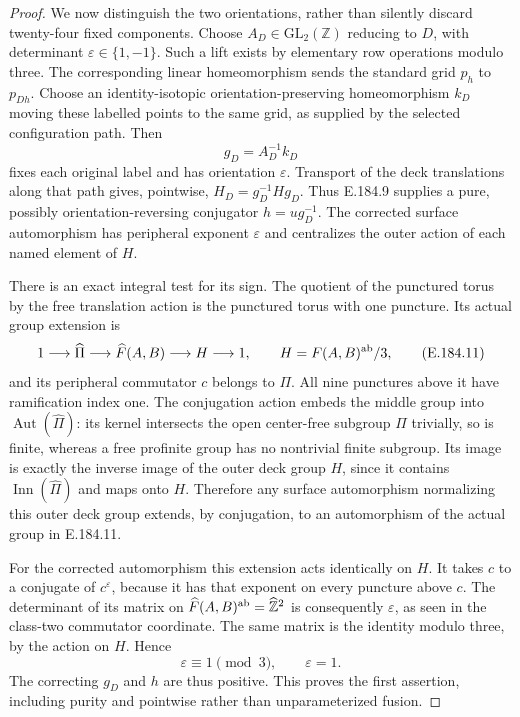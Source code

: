 \begin{proof}
We now distinguish the two orientations, rather than
silently discard twenty-four fixed components.
Choose \(A_D\in\mathrm{GL}_2(\mathbb Z)\) reducing to
\(D\), with determinant \(\varepsilon\in\{1,-1\}\).
Such a lift exists by elementary row operations modulo
three.  The corresponding linear homeomorphism sends
the standard grid \(p_h\) to \(p_{Dh}\).
Choose an identity-isotopic orientation-preserving
homeomorphism \(k_D\) moving these labelled points to
the same grid, as supplied by the selected configuration
path.  Then
\[
                         g_D=A_D^{-1}k_D
\tag{E.184.10}
\]
fixes each original label and has orientation
\(\varepsilon\).  Transport of the deck translations
along that path gives, pointwise,
\(H_D=g_D^{-1}Hg_D\).
Thus E.184.9 supplies a pure, possibly orientation-reversing
conjugator \(h=ug_D^{-1}\).  The corrected surface
automorphism has peripheral exponent \(\varepsilon\)
and centralizes the outer action of each named element
of \(H\).

There is an exact integral test for its sign.  The quotient
of the punctured torus by the free translation action is
the punctured torus with one puncture.  Its actual group
extension is
\[
 1\longrightarrow\widehat\Pi
 \longrightarrow\widehat F(A,B)
 \longrightarrow H\longrightarrow1,
 \qquad H=F(A,B)^{\rm ab}/3,
\tag{E.184.11}
\]
and its peripheral commutator \(c\) belongs to \(\Pi\).
All nine punctures above it have ramification index one.
The conjugation action embeds the middle group into
\(\operatorname{Aut}(\widehat\Pi)\): its kernel intersects
the open center-free subgroup \(\widehat\Pi\) trivially,
so is finite, whereas a free profinite group has no
nontrivial finite subgroup.  Its image is exactly the
inverse image of the outer deck group \(H\), since it
contains \(\operatorname{Inn}(\widehat\Pi)\) and maps
onto \(H\).
Therefore any surface automorphism normalizing this
outer deck group extends, by conjugation, to an
automorphism of the actual group in E.184.11.

For the corrected automorphism this extension acts
identically on \(H\).  It takes \(c\) to a conjugate
of \(c^{\varepsilon}\), because it has that exponent
on every puncture above \(c\).
The determinant of its matrix on
\(\widehat F(A,B)^{\rm ab}=\widehat{\mathbb Z}^2\)
is consequently \(\varepsilon\), as seen in the
class-two commutator coordinate.  The same matrix is
the identity modulo three, by the action on \(H\).
Hence
\[
                            \varepsilon\equiv1\pmod3,
                        \qquad \varepsilon=1.
\tag{E.184.12}
\]
The correcting \(g_D\) and \(h\) are thus positive.
This proves the first assertion, including purity and
pointwise rather than unparameterized fusion.


\end{proof}
